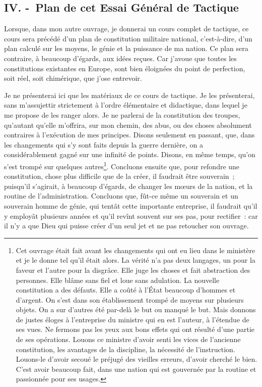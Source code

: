 \documentclass[french,twoside]{book} %
\begin{document}
\subsection[{IV. - Plan de cet Essai Général de Tactique}]{IV. - Plan de cet Essai Général de Tactique}
\noindent Lorsque, dans mon autre ouvrage, je donnerai un cours complet de tactique, ce cours sera précédé d’un plan de constitution militaire national, c’est-à-dire, d’un plan calculé sur les moyens, le génie et la puissance de ma nation. Ce plan sera contraire, à beaucoup d’égards, aux idées reçues. Car j’avoue que toutes les constitutions existantes en Europe, sont bien éloignées du point de perfection, soit réel, soit chimérique, que j’ose entrevoir.\par
Je ne présenterai ici que les matériaux de ce cours de tactique. Je les présenterai, sans m’assujettir strictement à l’ordre élémentaire et didactique, dans lequel je me propose de les ranger alors. Je ne parlerai de la constitution des troupes, qu’autant qu’elle m’offrira, sur mon chemin, des abus, ou des choses absolument contraires à l’exécution de mes principes. Disons seulement en passant, que, dans les changements qui s’y sont faits depuis la guerre dernière, on a considérablement gagné sur une infinité de points. Disons, en même temps, qu’on s’est trompé sur quelques autres\footnote{Cet ouvrage était fait avant les changements qui ont eu lieu dans le ministère et je le donne tel qu’il était alors. La vérité n’a pas deux langages, un pour la faveur et l’autre pour la disgrâce. Elle juge les choses et fait abstraction des personnes. Elle blâme sans fiel et loue sans adulation. La nouvelle constitution a des défauts. Elle a coûté à l’État beaucoup d’hommes et d’argent. On s’est dans son établissement trompé de moyens sur plusieurs objets. On a sur d’autres été par-delà le but ou manqué le but. Mais donnons de justes éloges à l’entreprise du ministre qui en est l’auteur, à l’étendue de ses vues. Ne fermons pas les yeux aux bons effets qui ont résulté d’une partie de ses opérations. Louons ce ministre d’avoir senti les vices de l’ancienne constitution, les avantages de la discipline, la nécessité de l’instruction. Louons-le d’avoir secoué le préjugé des vieilles erreurs, d’avoir cherché le bien. C’est avoir beaucoup fait, dans une nation qui est gouvernée par la routine et passionnée pour ses usages.}. Concluons ensuite que, pour refondre une constitution, chose plus difficile que de la créer, il faudrait être souverain ; puisqu’il s’agirait, à beaucoup d’égards, de changer les mœurs de la nation, et la routine de l’administration. Concluons que, fût-ce même un souverain et un souverain homme de génie, qui tentât cette importante entreprise, il faudrait qu’il y employât plusieurs années et qu’il revînt souvent sur ses pas, pour rectifier : car il n’y a que Dieu qui puisse créer d’un seul jet et ne pas retoucher son ouvrage.\par
\end{document}
